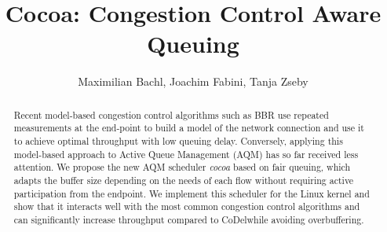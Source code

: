 \documentclass[10pt,sigconf,letterpaper,dvipsnames\ifx\removeHeaders\tempYes ,nonacm\fi]{acmart}
\newcommand{\codel}{CoDel}
\begin{document}
\title{Cocoa: Congestion Control Aware Queuing}



\begin{abstract}
Recent model-based congestion control algorithms such as BBR use repeated measurements at the end-point to build a model of the network connection and use it to achieve optimal throughput with low queuing delay. Conversely, applying this model-based approach to Active Queue Management (AQM) has so far received less attention. We propose the new AQM scheduler \textit{cocoa} based on fair queuing, which adapts the buffer size depending on the needs of each flow without requiring active participation from the endpoint. We implement this scheduler for the Linux kernel and show that it interacts well with the most common congestion control algorithms and can significantly increase throughput compared to \codel while avoiding overbuffering.
\end{abstract}

\author{Maximilian Bachl, Joachim Fabini, Tanja Zseby}



\end{document}
